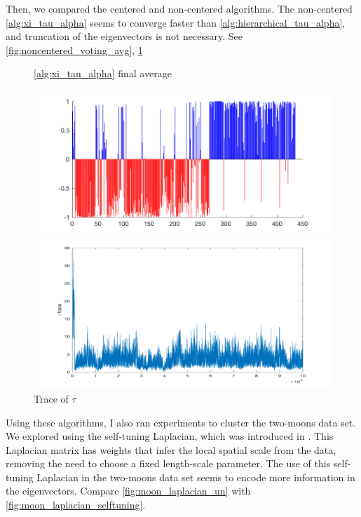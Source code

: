 \documentclass{siamart1116}
\begin{document}
Then, we compared the centered and non-centered algorithms. The non-centered \cref{alg:xi_tau_alpha} seems to converge faster than \cref{alg:hierarchical_tau_alpha}, and truncation of the eigenvectors is not necessary. See \cref{fig:noncentered_voting_avg}, \cref{fig:noncentered_voting_tau}

\begin{figure}[H]
\begin{minipage}{0.48\textwidth}
    \caption{\label{fig:noncentered_voting_avg}\cref{alg:xi_tau_alpha} final average}
    \includegraphics[width=\linewidth]{noncentered/final_avg.png}
\end{minipage}\hfill
\begin{minipage}{0.48\textwidth}
    \caption{\label{fig:noncentered_voting_tau} Trace of $\tau$}
    \includegraphics[width=\linewidth]{noncentered/trace_tau.png}
\end{minipage}
\end{figure}

Using these algorithms, I also ran experiments to cluster the two-moons data set. We explored using the self-tuning Laplacian, which was introduced in \cite{SelfTuning}. This Laplacian matrix has weights that infer the local spatial scale from the data, removing the need to choose a fixed length-scale parameter. The use of this self-tuning Laplacian in the two-moons data set seems to encode more information in the eigenvectors. Compare \cref{fig:moon_laplacian_un} with \cref{fig:moon_laplacian_selftuning}. 
\end{document}
